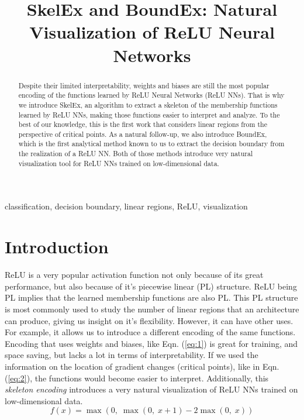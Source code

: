 \documentclass{article}
\title{SkelEx and BoundEx: Natural Visualization of ReLU Neural Networks}
\begin{document}

\maketitle

\begin{abstract}
Despite their limited interpretability, weights and biases are still the most popular encoding of the functions learned by ReLU Neural Networks (ReLU NNs). That is why we introduce SkelEx, an algorithm to extract a skeleton of the membership functions learned by ReLU NNs, making those functions easier to interpret and analyze. To the best of our knowledge, this is the first work that considers linear regions from the perspective of critical points. As a natural follow-up, we also introduce BoundEx, which is the first analytical method known to us to extract the decision boundary from the realization of a ReLU NN. Both of those methods introduce very natural visualization tool for ReLU NNs trained on low-dimensional data.
\end{abstract}
%
\begin{keywords}
classification, decision boundary, linear regions, ReLU, visualization
\end{keywords}
%

\section{Introduction}

ReLU is a very popular activation function not only because of its great performance, but also because of it's piecewise linear (PL) structure. ReLU being PL implies that the learned membership functions are also PL. This PL structure is most commonly used to study the number of linear regions that an architecture can produce, giving us insight on it's flexibility. However, it can have other uses. For example, it allows us to introduce a different encoding of the same functions. Encoding that uses weights and biases, like Eqn. (\ref{eq:1}) is great for training, and space saving, but lacks a lot in terms of interpretability. If we used the information on the location of gradient changes (critical points), like in Eqn. (\ref{eq:2}), the functions would become easier to interpret. Additionally, this \textit{skeleton encoding} introduces a very natural visualization of ReLU NNs trained on low-dimensional data.
\begin{equation} \label{eq:1}
    f(x) = \max(0,\; \max(0,\; x+1) - 2\max(0,\; x))
\end{equation}
\end{document}

